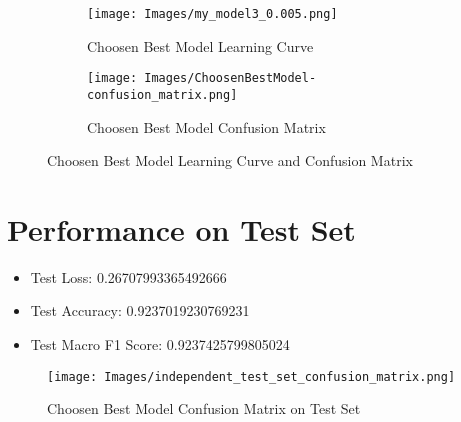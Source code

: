 \documentclass{article}
\begin{document}
\begin{figure}[h]
    \begin{subfigure}{0.5\textwidth}
        \texttt{[image: Images/my\_model3\_0.005.png]} 
        \caption{Choosen Best Model Learning Curve}
        \label{fig:model3_lr_0.005_best}
    \end{subfigure}
    \begin{subfigure}{0.5\textwidth}
        \texttt{[image: Images/ChoosenBestModel-confusion\_matrix.png]} 
        \caption{Choosen Best Model Confusion Matrix}
        \label{fig:model3_lr_0.005_confusion_matrix_best}
    \end{subfigure}
    \caption{Choosen Best Model Learning Curve and Confusion Matrix}
    \label{fig:model3_lr_0.005_combined_best}
\end{figure}

\section{Performance on Test Set}
\begin{itemize}
    \item Test Loss:  0.26707993365492666
    \item Test Accuracy:  0.9237019230769231
    \item Test Macro F1 Score:  0.9237425799805024
\end{itemize}
\begin{figure}[h]
    \centering
    \texttt{[image: Images/independent\_test\_set\_confusion\_matrix.png]} 
    \caption{Choosen Best Model Confusion Matrix on Test Set}
    \label{fig:model3_lr_0.005_confusion_matrix_test}
\end{figure}
\end{document}

